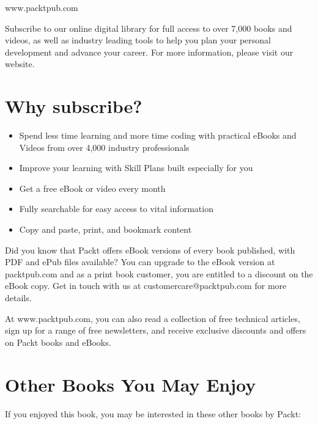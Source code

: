 
www.packtpub.com

Subscribe to our online digital library for full access to over 7,000 books and videos, as well as industry leading tools to help you plan your personal development and advance your career. For more information, please visit our website.

\section{Why subscribe?}

\begin{itemize}
\item
  Spend less time learning and more time coding with practical eBooks and Videos from over 4,000 industry professionals
\item
  Improve your learning with Skill Plans built especially for you
\item
  Get a free eBook or video every month
\item
  Fully searchable for easy access to vital information
\item
  Copy and paste, print, and bookmark content
\end{itemize}

Did you know that Packt offers eBook versions of every book published, with PDF and ePub files available? You can upgrade to the eBook version at packtpub.com and as a print book customer, you are entitled to a discount on the eBook copy. Get in touch with us at customercare@packtpub.com for more details.

At www.packtpub.com, you can also read a collection of free technical articles, sign up for a range of free newsletters, and receive exclusive discounts and offers on Packt books and eBooks.

\section{Other Books You May Enjoy}

If you enjoyed this book, you may be interested in these other books by Packt:

